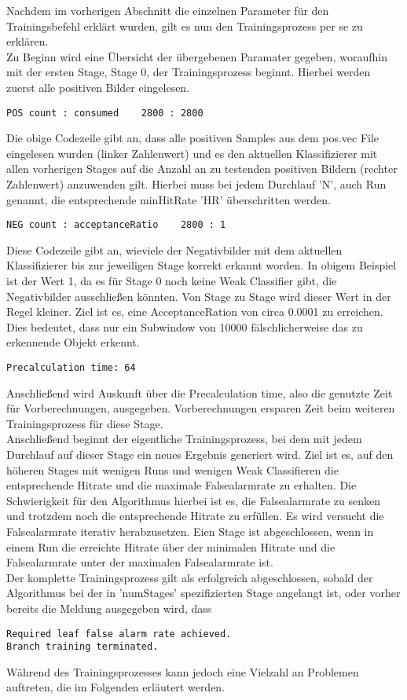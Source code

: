 Nachdem im vorherigen Abschnitt die einzelnen Parameter für den Trainingsbefehl erklärt wurden, gilt es nun den Trainingsprozess per se zu erklären.\\
Zu Beginn wird eine Übersicht der übergebenen Paramater gegeben, woraufhin mit der ersten Stage, Stage 0, der Trainingsprozess beginnt. Hierbei werden zuerst alle positiven Bilder eingelesen.
\begin{lstlisting}
POS count : consumed    2800 : 2800
\end{lstlisting}
Die obige Codezeile gibt an, dass alle positiven Samples aus dem pos.vec File eingelesen wurden (linker Zahlenwert) und es den aktuellen Klassifizierer mit allen vorherigen Stages auf die Anzahl an zu testenden positiven Bildern (rechter Zahlenwert) anzuwenden gilt. Hierbei muss bei jedem Durchlauf 'N', auch Run genannt, die entsprechende minHitRate 'HR' überschritten werden.\\
\begin{lstlisting}
NEG count : acceptanceRatio    2800 : 1
\end{lstlisting}
Diese Codezeile gibt an, wieviele der Negativbilder mit dem aktuellen Klassifizierer bis zur jeweiligen Stage korrekt erkannt worden. In obigem Beispiel ist der Wert 1, da es für Stage 0 noch keine Weak Classifier gibt, die Negativbilder ausschließen könnten. Von Stage zu Stage wird dieser Wert in der Regel kleiner. Ziel ist es, eine AcceptanceRation von circa 0.0001 zu erreichen. Dies bedeutet, dass nur ein Subwindow von 10000 fälschlicherweise das zu erkennende Objekt erkennt.\\
\begin{lstlisting}
Precalculation time: 64
\end{lstlisting}
Anschließend wird Auskunft über die Precalculation time, also die genutzte Zeit für Vorberechnungen, ausgegeben. Vorberechnungen ersparen Zeit beim weiteren Trainingsprozess für diese Stage.\\
Anschließend beginnt der eigentliche Trainingsprozess, bei dem mit jedem Durchlauf auf dieser Stage ein neues Ergebnis generiert wird. Ziel ist es, auf den höheren Stages mit wenigen Runs und wenigen Weak Classifieren die entsprechende Hitrate und die maximale Falsealarmrate zu erhalten. Die Schwierigkeit für den Algorithmus hierbei ist es, die Falsealarmrate zu senken und trotzdem noch die entsprechende Hitrate zu erfüllen. Es wird versucht die Falsealarmrate iterativ herabzusetzen. Eien Stage ist abgeschlossen, wenn in einem Run die erreichte Hitrate über der minimalen Hitrate und die Falsealarmrate unter der maximalen Falsealarmrate ist. \\
Der komplette Trainingsprozess gilt als erfolgreich abgeschlossen, sobald der Algorithmus bei der in 'numStages' spezifizierten Stage angelangt ist, oder vorher bereits die Meldung ausgegeben wird, dass
\begin{lstlisting}
Required leaf false alarm rate achieved.
Branch training terminated.
\end{lstlisting}
Während des Trainingsprozesses kann jedoch eine Vielzahl an Problemen auftreten, die im Folgenden erläutert werden.
\label{sec:Trainingsprozess}